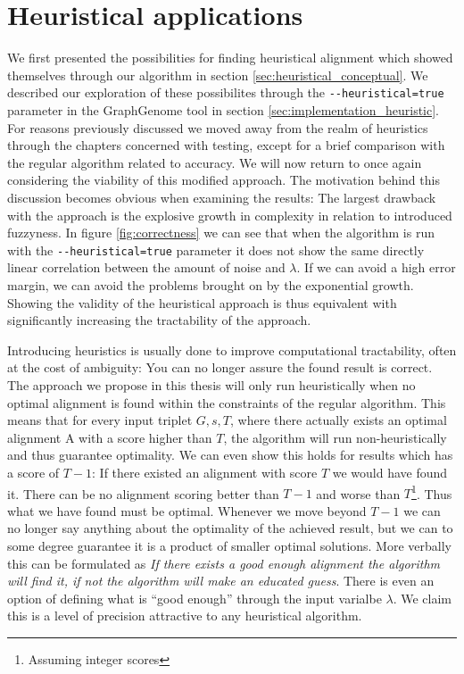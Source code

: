 \documentclass[thesis.tex]{subfiles}
\begin{document}
\section{Heuristical applications}
\label{sec:heuristical_applications}
We first presented the possibilities for finding heuristical alignment which showed themselves through our algorithm in section \ref{sec:heuristical_conceptual}. We described our exploration of these possibilites through the \texttt{-{}-heuristical=true} parameter in the GraphGenome tool in section \ref{sec:implementation_heuristic}. For reasons previously discussed we moved away from the realm of heuristics through the chapters concerned with testing, except for a brief comparison with the regular algorithm related to accuracy. We will now return to once again considering the viability of this modified approach. The motivation behind this discussion becomes obvious when examining the results: The largest drawback with the approach is the explosive growth in complexity in relation to introduced fuzzyness. In figure \ref{fig:correctness} we can see that when the algorithm is run with the \texttt{-{}-heuristical=true} parameter it does not show the same directly linear correlation between the amount of noise and $\lambda$. If we can avoid a high error margin, we can avoid the problems brought on by the exponential growth. Showing the validity of the heuristical approach is thus equivalent with significantly increasing the tractability of the approach.\\
\par\noindent
Introducing heuristics is usually done to improve computational tractability, often at the cost of ambiguity: You can no longer assure the found result is correct. The approach we propose in this thesis will only run heuristically when no optimal alignment is found within the constraints of the regular algorithm. This means that for every input triplet ${G, s, T}$, where there actually exists an optimal alignment A with a score higher than $T$, the algorithm will run non-heuristically and thus guarantee optimality. We can even show this holds for results which has a score of $T-1$: If there existed an alignment with score $T$ we would have found it. There can be no alignment scoring better than $T-1$ and worse than $T$\footnote{Assuming integer scores}. Thus what we have found must be optimal. Whenever we move beyond $T-1$ we can no longer say anything about the optimality of the achieved result, but we can to some degree guarantee it is a product of smaller optimal solutions. More verbally this can be formulated as \textit{If there exists a good enough alignment the algorithm will find it, if not the algorithm will make an educated guess}. There is even an option of defining what is ``good enough'' through the input varialbe $\lambda$. We claim this is a level of precision attractive to any heuristical algorithm.
\end{document}
